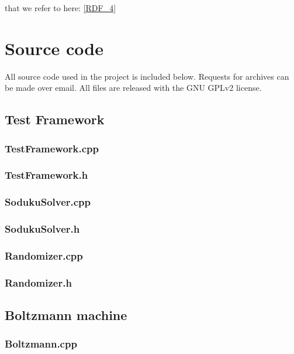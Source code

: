 \documentclass[a4paper,11pt]{kth-mag}
\begin{document}
that we refer to here: \ref{RDF_4}

\chapter{Source code}
\lstset{language=C++}

All source code used in the project is included below.
Requests for archives can be made over email.
All files are released with the GNU GPLv2 license.

\section{Test Framework}
\subsection{TestFramework.cpp}

\subsection{TestFramework.h}


\subsection{SodukuSolver.cpp}

\subsection{SodukuSolver.h}


\subsection{Randomizer.cpp}

\subsection{Randomizer.h}


\section{Boltzmann machine}
\subsection{Boltzmann.cpp}

\end{document}
